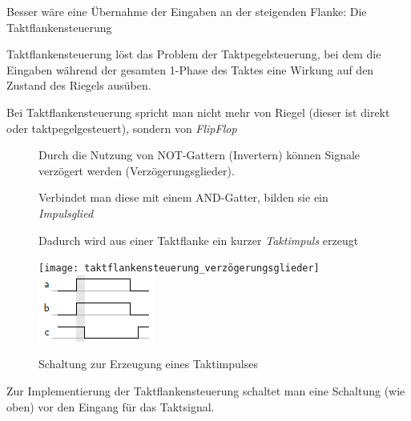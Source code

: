 \documentclass[12pt]{report}
\begin{document}
Besser wäre eine Übernahme der Eingaben an der steigenden Flanke: Die Taktflankensteuerung

\begin{defbox}[Taktflankensteuerung]
  Taktflankensteuerung löst das Problem der Taktpegelsteuerung, bei dem die Eingaben 
  während der gesamten 1-Phase des Taktes eine Wirkung auf den Zustand des Riegels ausüben.

  Bei Taktflankensteuerung spricht man nicht mehr von Riegel (dieser ist direkt oder taktpegelgesteuert), sondern von \textit{FlipFlop}
\end{defbox}

\begin{figure}[H]
  \begin{minipage}[t]{0.45\textwidth}
    Durch die Nutzung von NOT-Gattern (Invertern) können Signale verzögert werden (Verzögerungsglieder).

    Verbindet man diese mit einem AND-Gatter, bilden sie ein \textit{Impulsglied}

    Dadurch wird aus einer Taktflanke ein kurzer \textit{Taktimpuls} erzeugt
  \end{minipage}
  \hfill
  \begin{minipage}[t]{0.45\textwidth}
    \caption{Schaltung zur Erzeugung eines Taktimpulses}
    \centering
    \texttt{[image: taktflankensteuerung\_verzögerungsglieder]}
    \includegraphics{taktflankensteuerung_laufzeit}
  \end{minipage}
\end{figure}

Zur Implementierung der Taktflankensteuerung schaltet man eine Schaltung (wie oben) vor 
den Eingang für das Taktsignal.
\end{document}
